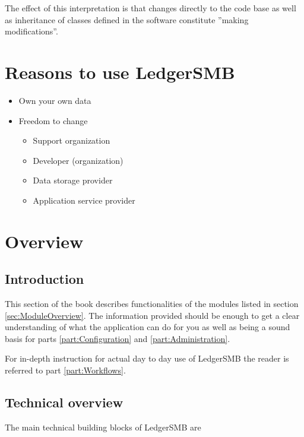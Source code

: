 The effect of this interpretation is that changes directly to the code base as
well as inheritance of classes defined in the software constitute ''making modifications''.

\chapter{Reasons to use LedgerSMB}

\begin{itemize}
\item Own your own data
\item Freedom to change
	\begin{itemize}
	\item Support organization
	\item Developer (organization)
	\item Data storage provider
	\item Application service provider
	\end{itemize}
\end{itemize}

\chapter{Overview}

\section{Introduction}
This section of the book describes functionalities of the modules listed in section \ref{sec:ModuleOverview}.  The information provided should be enough to get a clear
understanding of what the application can do for you as well as being a sound basis
for parts \ref{part:Configuration} and \ref{part:Administration}.

For in-depth instruction for actual day to day use of LedgerSMB the reader is referred
to part \ref{part:Workflows}.

\section{Technical overview}




The main technical building blocks of LedgerSMB are

